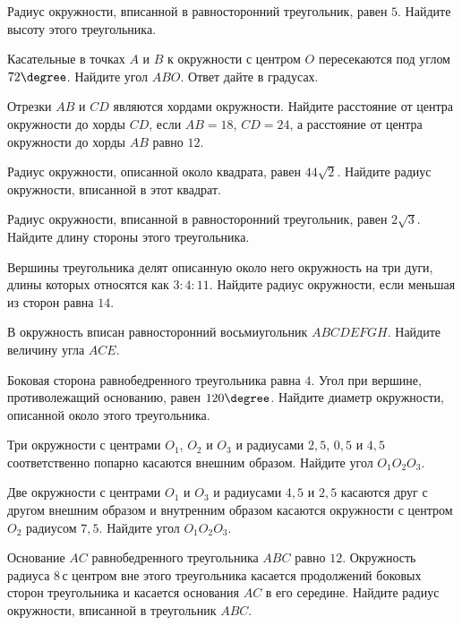 \begin{class}[number=6]
\begin{listofex}
		\item Радиус окружности, вписанной в равносторонний треугольник, равен \( 5 \). Найдите высоту этого треугольника.
		\item Касательные в точках \( A \) и \( B \) к окружности с центром \( O \) пересекаются под углом \( 72\degree \). Найдите угол \( ABO \). Ответ дайте в градусах.
		\item Отрезки \( AB \) и \( CD \) являются хордами окружности. Найдите расстояние от центра окружности до хорды \( CD \), если \( AB=18 \), \( CD=24 \), а расстояние от центра окружности до хорды \( AB \) равно \( 12 \).
		\item Радиус окружности, описанной около квадрата, равен \( 44\sqrt{2} \). Найдите радиус окружности, вписанной в этот квадрат.
		\item Радиус окружности, вписанной в равносторонний треугольник, равен \( 2\sqrt{3} \). Найдите длину стороны этого треугольника.
		\item Вершины треугольника делят описанную около него окружность на три дуги, длины которых относятся как \( 3:4:11 \). Найдите радиус окружности, если меньшая из сторон равна \( 14 \).
		\item В окружность вписан равносторонний восьмиугольник \( ABCDEFGH \). Найдите величину угла \( ACE \).
		\item Боковая сторона равнобедренного треугольника равна \( 4 \). Угол при вершине, противолежащий основанию, равен \( 120\degree \). Найдите диаметр окружности, описанной около этого треугольника.
		\item Три окружности с центрами \( O_1 \), \( O_2 \) и \( O_3 \) и радиусами \( 2,5 \), \( 0,5 \) и \( 4,5 \) соответственно попарно касаются внешним образом. Найдите угол \( O_1O_2O_3 \).
		\item Две окружности с центрами \( O_1 \) и \( O_3 \) и радиусами \( 4,5 \) и \( 2,5 \) касаются друг с другом внешним образом и внутренним образом касаются окружности с центром \( O_2 \) радиусом \( 7,5 \). Найдите угол \( O_1O_2O_3 \).
		\item Основание \( AC \) равнобедренного треугольника \( ABC \) равно \( 12 \). Окружность радиуса \( 8 \) с центром вне этого треугольника касается продолжений боковых сторон треугольника и касается основания \( AC \) в его середине. Найдите радиус окружности, вписанной в треугольник \( ABC \).
	\end{listofex}
\end{class}

